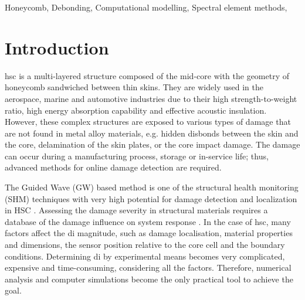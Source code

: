 \documentclass[a4paper,fleqn]{cas-dc}
\begin{document}
\begin{abstract}[S U M M A R Y]
	This study aims to assess the debonding of the carbon skin from the honeycomb core in the sandwich panel based on guided wave propagation.
	The effect of damage on wave propagation in the panel was determined using numerical simulations.
	The two most common honeycomb core models found in the literature are a homogenized, orthogonal continuous medium and a real geometry core modelled by finite elements, usually using commercial software.
	In a simplified model, the results are in good agreement only for low frequencies.
	In this paper, the panel wad modelled by the time-domain spectral element method taking into account the real geometry of the honeycomb core.
	The presented model was compared with the homogenized model of the 
	The result of the parametric study is a function of damage influence on the amplitude of propagating waves.
\end{abstract}
\begin{keywords}
Honeycomb, Debonding, Computational modelling, Spectral element methods, 
\end{keywords}

\maketitle

\section{Introduction}
\label{sec:intro}
\Ac{hsc} is a multi-layered structure composed of the mid-core with the geometry of honeycomb sandwiched between thin skins.
They are widely used in the aerospace, marine and automotive industries due to their high strength-to-weight ratio, high energy absorption capability and effective acoustic insulation.
However, these complex structures are exposed to various types of damage that are not found in metal alloy materials, e.g. hidden disbonds between the skin and the core, delamination of the skin plates, or the core impact damage.
The damage can occur during a manufacturing process, storage or in-service life; thus, advanced methods for online damage detection are required.

The Guided Wave (GW) based method is one of the structural health monitoring (SHM) techniques with very high potential for damage detection and localization in HSC \cite{mustapha2011assessment, sikdar2016guided, sikdar2016ultrasonic,radzienski2016assessment, yu2019core}.
Assessing the damage severity in structural materials requires a database of the damage influence on system response \cite{worden2007fundamental}.
In the case of \ac{hsc}, many factors affect the \ac{di} magnitude, such as damage localisation, material properties and dimensions, the sensor position relative to the core cell and the boundary conditions.
Determining \ac{di} by experimental means becomes very complicated, expensive and time-consuming, considering all the factors.
Therefore, numerical analysis and computer simulations become the only practical tool to achieve the goal.
\end{document}

